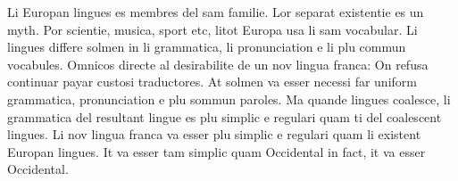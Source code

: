 Li Europan lingues es membres del sam familie. Lor separat existentie es un myth. Por scientie, musica, sport etc, litot Europa usa li sam vocabular. Li lingues differe solmen in li grammatica, li pronunciation e li plu commun vocabules. Omnicos directe al desirabilite de un nov lingua franca: On refusa continuar payar custosi traductores. At solmen va esser necessi far uniform grammatica, pronunciation e plu sommun paroles. Ma quande lingues coalesce, li grammatica del resultant lingue es plu simplic e regulari quam ti del coalescent lingues. Li nov lingua franca va esser plu simplic e regulari quam li existent Europan lingues. It va esser tam simplic quam Occidental in fact, it va esser Occidental.